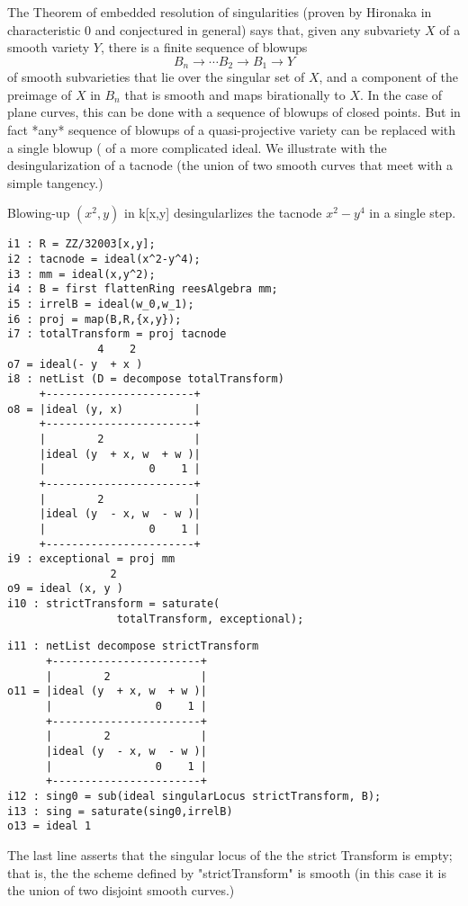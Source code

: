 \documentclass[twoside,12pt, leqno]{amsart}
\begin{document}
The Theorem of embedded resolution of singularities (proven by Hironaka in characteristic 0 and conjectured in general) says that, given any subvariety $X$ of a smooth variety $Y$, there is
a finite sequence of blowups 
$$
B_n \to \cdots B_2 \to B_1 \to Y
$$
of smooth subvarieties that lie over the singular set of $X$,  and a component of the preimage of
$X$ in $B_n$ that is smooth and maps birationally to $X$. In the case of plane curves, this can be done with a sequence of blowups of closed points. But in fact *any* sequence of blowups of a quasi-projective variety can be replaced with a single blowup (\cite[Theorem II.7.17]{H} of a more complicated ideal. We illustrate with the desingularization of a tacnode (the union of two smooth curves that meet with a simple tangency.)

\begin{example}
Blowing-up $(x^2,y)$ in k[x,y] desingularlizes the tacnode $x^2-y^4$ in a single step. 
\end{example}
\begin{footnotesize}
 \begin{verbatim}
i1 : R = ZZ/32003[x,y];
i2 : tacnode = ideal(x^2-y^4);
i3 : mm = ideal(x,y^2);
i4 : B = first flattenRing reesAlgebra mm;
i5 : irrelB = ideal(w_0,w_1);
i6 : proj = map(B,R,{x,y});
i7 : totalTransform = proj tacnode
              4    2
o7 = ideal(- y  + x )
i8 : netList (D = decompose totalTransform)
     +-----------------------+
o8 = |ideal (y, x)           |
     +-----------------------+
     |        2              |
     |ideal (y  + x, w  + w )|
     |                0    1 |
     +-----------------------+
     |        2              |
     |ideal (y  - x, w  - w )|
     |                0    1 |
     +-----------------------+
i9 : exceptional = proj mm
                2
o9 = ideal (x, y )
i10 : strictTransform = saturate(
                 totalTransform, exceptional);
\end{verbatim}
\eject
\begin{verbatim}
i11 : netList decompose strictTransform
      +-----------------------+
      |        2              |
o11 = |ideal (y  + x, w  + w )|
      |                0    1 |
      +-----------------------+
      |        2              |
      |ideal (y  - x, w  - w )|
      |                0    1 |
      +-----------------------+
i12 : sing0 = sub(ideal singularLocus strictTransform, B);
i13 : sing = saturate(sing0,irrelB)
o13 = ideal 1
\end{verbatim}
\end{footnotesize}
The last line asserts that the singular locus of the the strict Transform is empty;
that is, the the scheme defined by "strictTransform" is smooth (in this case it is the union
of two disjoint smooth curves.)
\end{document}
